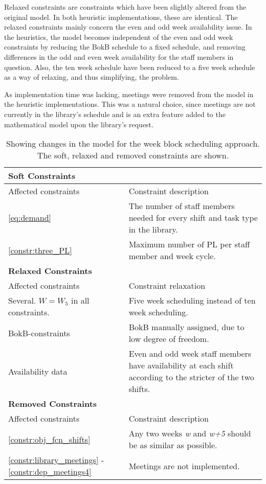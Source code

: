 Relaxed constraints are constraints which have been slightly altered from the original model. In both heuristic implementations, these are identical. The relaxed constraints mainly concern the even and odd week availability issue. In the heuristics, the model becomes independent of the even and odd week constraints by reducing the BokB schedule to a fixed schedule, and removing differences in the odd and even week availability for the staff members in question. Also, the ten week schedule have been reduced to a five week schedule as a way of relaxing, and thus simplifying, the problem.

As implementation time was lacking, meetings were removed from the model in the heuristic implementations. This was a natural choice, since meetings are not currently in the library's schedule and is an extra feature added to the mathematical model upon the library's request.

\begin{table}[!h]
\centering
\caption{Showing changes in the model for the week block scheduling approach. The soft, relaxed and removed constraints are shown.}
\label{tab:weekly_task_constraints}
\begin{tabular}{|p{4cm}|p{7cm}|}
\hline
\multicolumn{2}{|l|}{\cellcolor{gray!90} \textbf{Soft Constraints}} \\
\hline 
\rowcolor{Gray} Affected constraints & Constraint description \\ \hline
\ref{eq:demand} & The number of staff members needed for every shift and task type in the library.  \\ \hline
\ref{constr:three_PL} & Maximum number of PL per staff member and week cycle. \\ \hline
\multicolumn{2}{|l|}{\cellcolor{gray!90} \textbf{Relaxed Constraints}} \\
\hline 
\rowcolor{Gray} Affected constraints & Constraint relaxation \\ \hline
Several. $W = W_5$ in all constraints. & Five week scheduling instead of ten week scheduling. \\ \hline
BokB-constraints & BokB manually assigned, due to low degree of freedom. \\ \hline
Availability data & Even and odd week staff members have availability at each shift according to the stricter of the two shifts. \\ \hline
\multicolumn{2}{|l|}{\cellcolor{gray!90} \textbf{Removed Constraints}} \\
\hline 
\rowcolor{Gray} Affected constraints & Constraint description \\ \hline
\ref{constr:obj_fcn_shifts} & Any two weeks \textit{w} and \textit{w+5} should be as similar as possible. \\ \hline
\ref{constr:library_meetings} - \ref{constr:dep_meetings4} & Meetings are not implemented. \\ \hline
\end{tabular}
\end{table}



